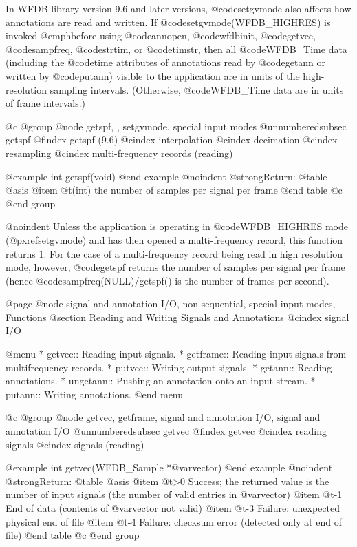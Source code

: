 {{{{{{{{{In WFDB library version 9.6 and later versions, @code{setgvmode} also affects
how annotations are read and written.  If @code{setgvmode(WFDB_HIGHRES)} is
invoked @emph{before} using @code{annopen}, @code{wfdbinit}, @code{getvec},
@code{sampfreq}, @code{strtim}, or @code{timstr}, then all @code{WFDB_Time}
data (including the @code{time} attributes of annotations read by @code{getann}
or written by @code{putann}) visible to the application are in units of the
high-resolution sampling intervals.  (Otherwise, @code{WFDB_Time} data are in
units of frame intervals.)

@c @group
@node     getspf, , setgvmode, special input modes
@unnumberedsubsec getspf
@findex getspf (9.6)
@cindex interpolation
@cindex decimation
@cindex resampling
@cindex multi-frequency records (reading)

@example
int getspf(void)
@end example
@noindent
@strong{Return:}
@table @asis
@item @t{(int)}
the number of samples per signal per frame
@end table
@c @end group

@noindent
Unless the application is operating in @code{WFDB_HIGHRES} mode
(@pxref{setgvmode}) and has then opened a multi-frequency record, this
function returns 1.  For the case of a multi-frequency record being read
in high resolution mode, however, @code{getspf} returns the number of
samples per signal per frame (hence @code{sampfreq(NULL)/getspf()} is
the number of frames per second).

@page
@node     signal and annotation I/O, non-sequential, special input modes, Functions
@section Reading and Writing Signals and Annotations
@cindex signal I/O

@menu
* getvec::		Reading input signals.
* getframe::            Reading input signals from multifrequency records.
* putvec::		Writing output signals.
* getann::		Reading annotations.
* ungetann::		Pushing an annotation onto an input stream.
* putann::		Writing annotations.
@end menu

@c @group
@node    getvec, getframe, signal and annotation I/O, signal and annotation I/O
@unnumberedsubsec getvec
@findex getvec
@cindex reading signals
@cindex signals (reading)

@example
int getvec(WFDB_Sample *@var{vector})
@end example
@noindent
@strong{Return:}
@table @asis
@item @t{>0}
Success;  the returned value is the number of input signals (the number of
valid entries in @var{vector})
@item @t{-1}
End of data (contents of @var{vector} not valid)
@item @t{-3}
Failure: unexpected physical end of file
@item @t{-4}
Failure: checksum error (detected only at end of file)
@end table
@c @end group

}}}}}}}}}
